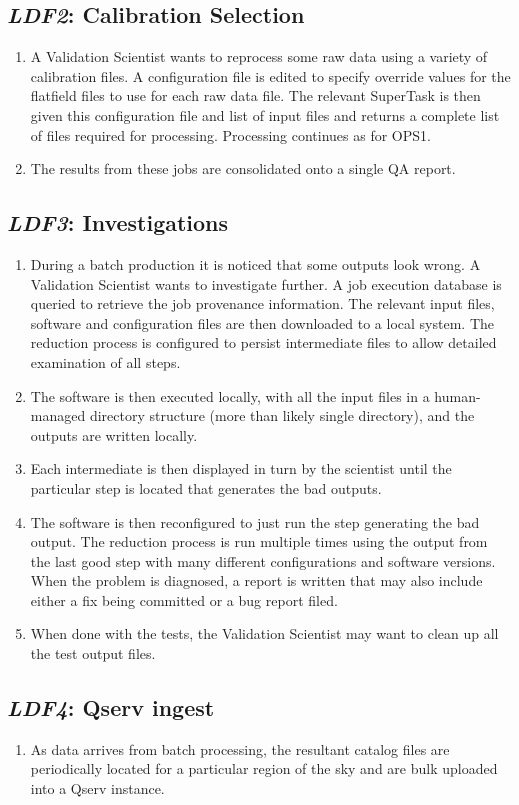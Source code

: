 \documentclass[DM,toc,lsstdraft]{lsstdoc}
\newcommand{\usecase}[3]{%
\subsection{\emph{#1}: #2}
\label{use:#1}
\begin{enumerate}[label=\alph*.]
#3
\end{enumerate}
}
\begin{document}
\usecase{LDF2}{Calibration Selection}{%

\item
A Validation Scientist wants to reprocess some raw data using a variety of calibration files.
A configuration file is edited to specify override values for the flatfield files to use for each raw data file.
The relevant SuperTask is then given this configuration file and list of input files and returns a complete list of files required for processing.
Processing continues as for OPS1.

\item
The results from these jobs are consolidated onto a single QA report.

}

\usecase{LDF3}{Investigations}{%

\item
During a batch production it is noticed that some outputs look wrong.
A Validation Scientist wants to investigate further.
A job execution database is queried to retrieve the job provenance information.
The relevant input files, software and configuration files are then downloaded to a local system.
The reduction process is configured to persist intermediate files to allow detailed examination of all steps.

\item
The software is then executed locally, with all the input files in a human-managed directory structure (more than likely single directory), and the outputs are written locally.

\item
Each intermediate is then displayed in turn by the scientist until the particular step is located that generates the bad outputs.

\item
The software is then reconfigured to just run the step generating the bad output.
The reduction process is run multiple times using the output from the last good step with many different configurations and software versions.
When the problem is diagnosed, a report is written that may also include either a fix being committed or a bug report filed.

\item
When done with the tests, the Validation Scientist may want to clean up all the test output files.

}

\usecase{LDF4}{Qserv ingest}{%

\item
As data arrives from batch processing, the resultant catalog files are periodically located for a particular region of the sky and are bulk uploaded into a Qserv instance.

}
\end{document}
